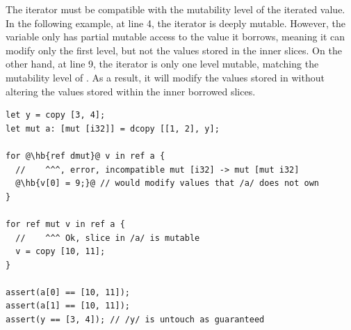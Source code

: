 The iterator must be compatible with the mutability level of the iterated value.
In the following example, at line 4, the iterator is deeply mutable. However,
the variable  only has partial mutable access to the value it borrows,
meaning it can modify only the first level, but not the values stored in the
inner slices. On the other hand, at line 9, the iterator is only one level
mutable, matching the mutability level of . As a result, it will modify
the values stored in  without altering the values stored within the
inner borrowed slices.

\begin{lstlisting}[style=coloredverbatimError, escapechar=@]
let y = copy [3, 4];
let mut a: [mut [i32]] = dcopy [[1, 2], y];

for @\hb{ref dmut}@ v in ref a {
  //    ^^^, error, incompatible mut [i32] -> mut [mut i32]
  @\hb{v[0] = 9;}@ // would modify values that /a/ does not own
}

for ref mut v in ref a {
  //    ^^^ Ok, slice in /a/ is mutable
  v = copy [10, 11];
}

assert(a[0] == [10, 11]);
assert(a[1] == [10, 11]);
assert(y == [3, 4]); // /y/ is untouch as guaranteed

\end{lstlisting}

\vfill%
\pagebreak
